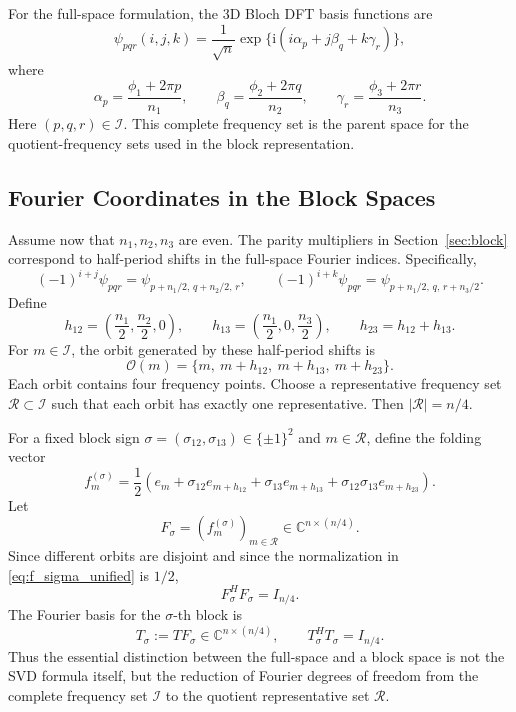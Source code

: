 \documentclass[11pt,oneside]{article}
\numberwithin{equation}{section}
\theoremstyle{plain}
\theoremstyle{remark}
\begin{document}
For the full-space formulation, the 3D Bloch DFT basis functions are
\begin{equation}\label{eq:psi_pqr_unified}
\psi_{pqr}(i,j,k)
=\frac1{\sqrt n}\exp\{\mathrm i(i\alpha_p+j\beta_q+k\gamma_r)\},
\end{equation}
where
\[
\alpha_p=\frac{\phi_1+2\pi p}{n_1},\qquad
\beta_q=\frac{\phi_2+2\pi q}{n_2},\qquad
\gamma_r=\frac{\phi_3+2\pi r}{n_3}.
\]
Here \((p,q,r)\in\mathcal I\). This complete frequency set is the parent space for the quotient-frequency sets used in the block representation.

\subsection{Fourier Coordinates in the Block Spaces}

Assume now that \(n_1,n_2,n_3\) are even. The parity multipliers in Section~\ref{sec:block} correspond to half-period shifts in the full-space Fourier indices. Specifically,
\[
(-1)^{i+j}\psi_{pqr}=\psi_{p+n_1/2,\,q+n_2/2,\,r},
\qquad
(-1)^{i+k}\psi_{pqr}=\psi_{p+n_1/2,\,q,\,r+n_3/2}.
\]
Define
\[
h_{12}=\left(\frac{n_1}{2},\frac{n_2}{2},0\right),\qquad
h_{13}=\left(\frac{n_1}{2},0,\frac{n_3}{2}\right),\qquad
h_{23}=h_{12}+h_{13}.
\]
For \(m\in\mathcal I\), the orbit generated by these half-period shifts is
\begin{equation}\label{eq:orbit_unified}
\mathcal O(m)=\{m,\ m+h_{12},\ m+h_{13},\ m+h_{23}\}.
\end{equation}
Each orbit contains four frequency points. Choose a representative frequency set \(\mathcal R\subset\mathcal I\) such that each orbit has exactly one representative. Then \(|\mathcal R|=n/4\).

For a fixed block sign \(\sigma=(\sigma_{12},\sigma_{13})\in\{\pm1\}^2\) and \(m\in\mathcal R\), define the folding vector
\begin{equation}\label{eq:f_sigma_unified}
f_m^{(\sigma)}
=\frac12\left(e_m+\sigma_{12}e_{m+h_{12}}
+\sigma_{13}e_{m+h_{13}}
+\sigma_{12}\sigma_{13}e_{m+h_{23}}\right).
\end{equation}
Let
\[
F_\sigma=(f_m^{(\sigma)})_{m\in\mathcal R}\in\mathbb C^{n\times(n/4)}.
\]
Since different orbits are disjoint and since the normalization in \eqref{eq:f_sigma_unified} is \(1/2\),
\[
F_\sigma^HF_\sigma=I_{n/4}.
\]
The Fourier basis for the \(\sigma\)-th block is
\begin{equation}\label{eq:Tsigma_unified}
T_\sigma:=TF_\sigma\in\mathbb C^{n\times(n/4)},
\qquad
T_\sigma^HT_\sigma=I_{n/4}.
\end{equation}
Thus the essential distinction between the full-space and a block space is not the SVD formula itself, but the reduction of Fourier degrees of freedom from the complete frequency set \(\mathcal I\) to the quotient representative set \(\mathcal R\).
\end{document}
